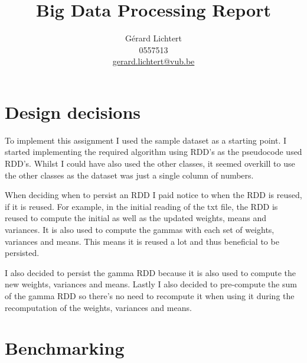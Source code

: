 \documentclass{article}
\title{Big Data Processing Report}
\author{Gérard Lichtert\\
0557513\\
\href{mailto:gerard.lichtert@vub.be}{gerard.lichtert@vub.be}
}
\begin{document}
\maketitle

\tableofcontents
\newpage
\raggedright
\section{Design decisions}
\label{sec:design-decisions}
To implement this assignment I used the sample dataset as a starting point.
I started implementing the required algorithm using RDD's as the pseudocode used RDD's.
Whilst I could have also used the other classes, it seemed overkill to use the other classes as the dataset was just a single column of numbers.
\par
When deciding when to persist an RDD I paid notice to when the RDD is reused, if it is reused.
For example, in the initial reading of the txt file, the RDD is reused to compute the initial as well as the updated weights, means and variances.
It is also used to compute the gammas with each set of weights, variances and means.
This means it is reused a lot and thus beneficial to be persisted.
\par
I also decided to persist the gamma RDD because it is also used to compute the new weights, variances and means.
Lastly I also decided to pre-compute the sum of the gamma RDD so there's no need to recompute it when using it during the recomputation of the weights, variances and means.
\section{Benchmarking}
\end{document}
